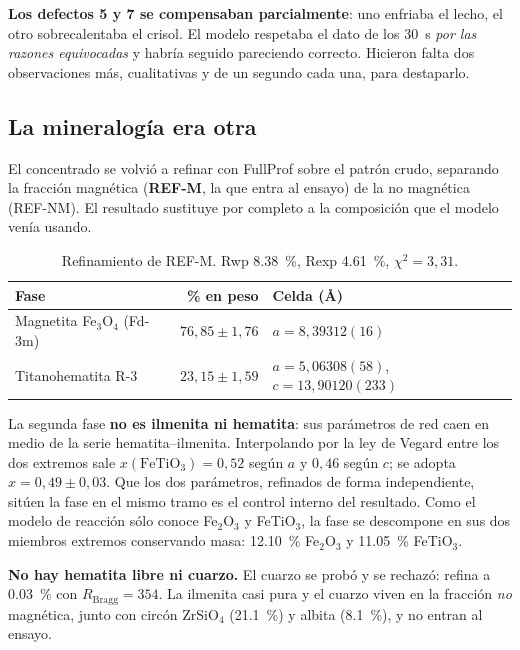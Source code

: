 \documentclass[11pt,a4paper]{article}
\newcommand{\ojo}[1]{\textcolor{aviso}{\textbf{#1}}}
\begin{document}
\noindent
\ojo{Los defectos 5 y 7 se compensaban parcialmente}: uno enfriaba el lecho, el
otro sobrecalentaba el crisol. El modelo respetaba el dato de los
\SI{30}{\second} \emph{por las razones equivocadas} y habría seguido pareciendo
correcto. Hicieron falta dos observaciones más, cualitativas y de un segundo cada
una, para destaparlo.

\subsection{La mineralogía era otra}
\label{sec:mineralogia}

El concentrado se volvió a refinar con FullProf sobre el patrón crudo, separando
la fracción magnética (\textbf{REF-M}, la que entra al ensayo) de la no magnética
(REF-NM). El resultado sustituye por completo a la composición que el modelo
venía usando.

\begin{table}[H]
\centering
\small
\begin{tabular}{lrl}
\toprule
\textbf{Fase} & \textbf{\% en peso} & \textbf{Celda (\si{\angstrom})} \\
\midrule
Magnetita Fe$_3$O$_4$ (Fd-3m) & $76{,}85 \pm 1{,}76$ & $a = 8{,}39312(16)$ \\
Titanohematita R-3 & $23{,}15 \pm 1{,}59$ & $a = 5{,}06308(58)$, $c = 13{,}90120(233)$ \\
\bottomrule
\end{tabular}
\caption{Refinamiento de REF-M. Rwp \qty{8.38}{\percent}, Rexp \qty{4.61}{\percent},
$\chi^2 = 3{,}31$.}
\end{table}

La segunda fase \textbf{no es ilmenita ni hematita}: sus parámetros de red caen
en medio de la serie hematita--ilmenita. Interpolando por la ley de Vegard entre
los dos extremos sale $x(\mathrm{FeTiO_3}) = 0{,}52$ según $a$ y $0{,}46$ según
$c$; se adopta $x = 0{,}49 \pm 0{,}03$. Que los dos parámetros, refinados de
forma independiente, sitúen la fase en el mismo tramo es el control interno del
resultado. Como el modelo de reacción sólo conoce Fe$_2$O$_3$ y FeTiO$_3$, la
fase se descompone en sus dos miembros extremos conservando masa:
\qty{12.10}{\percent} Fe$_2$O$_3$ y \qty{11.05}{\percent} FeTiO$_3$.

\ojo{No hay hematita libre ni cuarzo.} El cuarzo se probó y se rechazó: refina a
\qty{0.03}{\percent} con $R_{\mathrm{Bragg}} = 354$. La ilmenita casi pura y el
cuarzo viven en la fracción \emph{no} magnética, junto con circón ZrSiO$_4$
(\qty{21.1}{\percent}) y albita (\qty{8.1}{\percent}), y no entran al ensayo.
\end{document}

